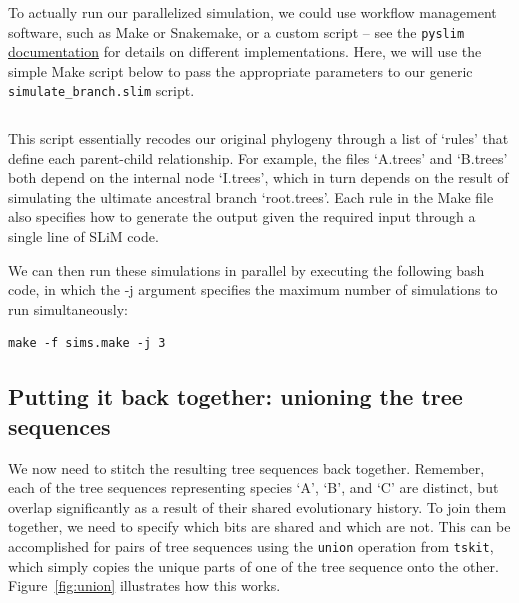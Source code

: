 \documentclass[12pt]{article}
\newcommand{\tskit}[0]{\texttt{tskit}\xspace}
\newcommand{\pyslim}[0]{\texttt{pyslim}\xspace}
\begin{document}
To actually run our parallelized simulation, we could use workflow management software, such as Make or Snakemake, or a custom script -- see the \pyslim
\href{https://tskit.dev/pyslim/docs/latest/vignette_parallel_phylo.html}{documentation} for details on different implementations. Here, we will use the simple Make script below to pass
the appropriate parameters to our generic \verb|simulate_branch.slim| script.
%
\inputminted[breaklines,fontsize=\small, breakanywhere=true, breakautoindent=true, linenos, bgcolor=gray!10]{basemake}{code/parallelizing_multiple_species/parallel_sims.make}
%
This script essentially recodes our original phylogeny through a list of `rules' that define each parent-child relationship.
For example, the files `A.trees' and `B.trees' both depend on the internal node `I.trees',
which in turn depends on the result of simulating the ultimate ancestral branch `root.trees'.
Each rule in the Make file also specifies how to generate the output given the required input through a single line of SLiM code.

We can then run these simulations in parallel by executing the following bash code,
in which the -j argument specifies the maximum number of simulations to run simultaneously:
\begin{verbatim}
make -f sims.make -j 3
\end{verbatim}

\subsection{Putting it back together: unioning the tree sequences}

We now need to stitch the resulting tree sequences back together.
Remember, each of the tree sequences representing species `A', `B', and `C'
are distinct, but overlap significantly as a result of their shared evolutionary history.
To join them together, we need to specify which bits are shared and which are not.
This can be accomplished for pairs of tree sequences using the \verb|union| operation from \tskit,
which simply copies the unique parts of one of the tree sequence onto the other.
Figure~\ref{fig:union} illustrates how this works.
\end{document}
